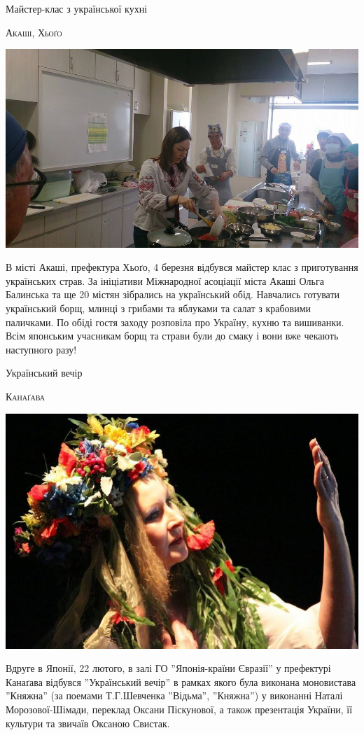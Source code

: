 \documentclass[10pt,a4paper]{article}
\newcommand{\NewsItem}[1]{%
		\usefont{T2A}{iwona}{m}{n} 
		\large #1 \vspace{4pt}
		\par \normalsize \normalfont}
\newcommand{\NewsAuthor}[1]{%
			\hfill \textsc{#1} \vspace{4pt}
			\par \normalfont}
\begin{document}
\newpage

\begin{multicols}{3}
\NewsItem{Майстер-клас з української кухні}
\NewsAuthor{Акаші, Хьоґо}
		\begin{center}
			\includegraphics[width=0.8\linewidth]{images/ukr-cuisine-akashi}
		\end{center}
В місті Акаші, префектура Хьоґо, 4 березня відбувся майстер клас з приготування українських страв. За ініціативи Міжнародної асоціації міста Акаші Ольга Балинська та ще 20 містян зібрались на український обід. Навчались готувати український борщ, млинці з грибами та яблуками та салат з крабовими паличками. По обіді гостя заходу розповіла про Україну, кухню та вишиванки. Всім японським учасникам борщ та страви були до смаку і вони вже чекають наступного разу!

\vspace{1cm}
\NewsItem{Український вечір}
\NewsAuthor{Канаґава}
		\begin{center}
			\includegraphics[width=0.8\linewidth]{images/ukr-evening}
		\end{center}
Вдруге в Японії, 22 лютого, в залі ГО ''Японія-країни Євразії'' у префектурі Канаґава відбувся ''Український вечір'' в рамках якого була виконана моновистава ''Княжна'' (за поемами Т.Г.Шевченка ''Відьма'', ''Княжна'') у виконанні Наталі Морозової-Шімади, переклад Оксани Піскунової, а також презентація України, її культури та звичаїв Оксаною Свистак.


\end{multicols}
\end{document}
